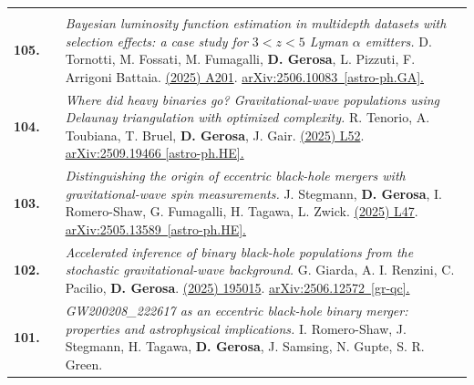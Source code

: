 {\begin{longtable}{rp{0.3cm}p{15.8cm}}
\vspace{0.09cm}\\
%
\textbf{105.} & & \textit{Bayesian luminosity function estimation in multidepth datasets with selection effects: a case study for $3<z<5$ Lyman $\alpha$ emitters.}
\newline{}
D. Tornotti, M. Fossati, M. Fumagalli, \textbf{D. Gerosa}, L. Pizzuti, F. Arrigoni Battaia.
\newline{}
\href{https://doi.org/10.1051/0004-6361/202555898}{\aap 704 (2025) A201}. \href{https://arxiv.org/abs/2506.10083}{arXiv:2506.10083 [astro-ph.GA].}
\vspace{0.09cm}\\
%
\textbf{104.} & & \textit{Where did heavy binaries go? Gravitational-wave populations using Delaunay triangulation with optimized complexity.}
\newline{}
R. Tenorio, A. Toubiana, T. Bruel, \textbf{D. Gerosa}, J. Gair.
\newline{}
\href{https://iopscience.iop.org/article/10.3847/2041-8213/ae1cbd}{\apjl 994 (2025) L52}. \href{https://arxiv.org/abs/2509.19466}{arXiv:2509.19466 [astro-ph.HE].}
\vspace{0.09cm}\\
%
\textbf{103.} & & \textit{Distinguishing the origin of eccentric black-hole mergers with gravitational-wave spin measurements.}
\newline{}
J. Stegmann, \textbf{D. Gerosa}, I. Romero-Shaw, G. Fumagalli, H. Tagawa, L. Zwick.
\newline{}
\href{https://iopscience.iop.org/article/10.3847/2041-8213/ae1d66}{\apjl 994 (2025) L47}. \href{https://arxiv.org/abs/2505.13589}{arXiv:2505.13589 [astro-ph.HE].}
\vspace{0.09cm}\\
%
\textbf{102.} & & \textit{Accelerated inference of binary black-hole populations from the stochastic gravitational-wave background.}
\newline{}
G. Giarda, A. I. Renzini, C. Pacilio, \textbf{D. Gerosa}.
\newline{}
\href{https://iopscience.iop.org/article/10.1088/1361-6382/ae07a0}{\cqg 42 (2025) 195015}. \href{https://arxiv.org/abs/2506.12572}{arXiv:2506.12572 [gr-qc].}
\vspace{0.09cm}\\
%
\textbf{101.} & & \textit{GW200208\_222617 as an eccentric black-hole binary merger: properties and astrophysical implications.}
\newline{}
I. Romero-Shaw, J. Stegmann, H. Tagawa, \textbf{D. Gerosa}, J. Samsing, N. Gupte, S. R. Green.

\end{longtable}}
